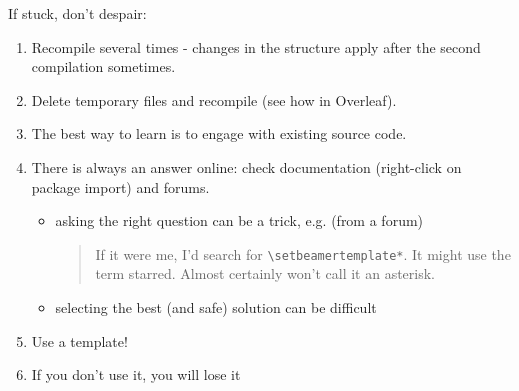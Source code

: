 \documentclass[11pt]{beamer} %
\begin{document}
\begin{frame}{If stuck, don't despair:}	
	\begin{exampleblock}{}
		\begin{enumerate}
			\item Recompile several times - changes in the structure apply after the second compilation sometimes.
			\item Delete temporary files and recompile (see how in Overleaf).
			\item The best way to learn is to engage with existing source code.
			\item There is always an answer online: check documentation (right-click on package import) and forums.  
			\begin{itemize}
				\item asking the right question can be a trick, e.g. (from a forum)
				\begin{quote}
If it were me, I'd search for \verb|\setbeamertemplate*|. It might use the term starred. Almost certainly won't call it an asterisk.
				\end{quote}
				\item selecting the best (and safe) solution can be difficult
			\end{itemize}
		\item Use a template!
		\item If you don't use it, you will lose it

		\end{enumerate}
	\end{exampleblock}
\end{frame}
\end{document}
